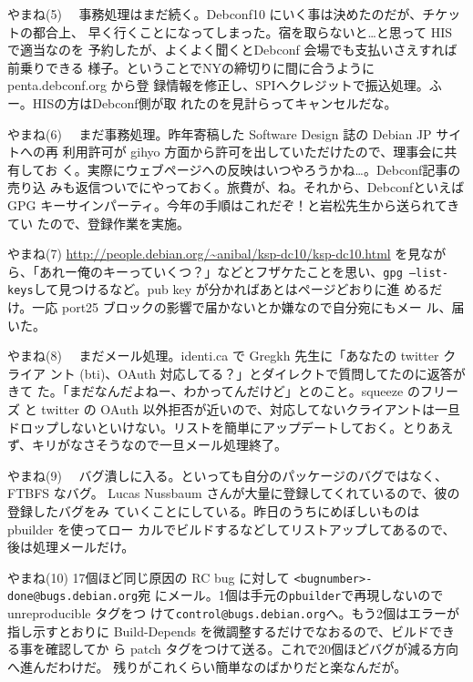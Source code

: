 \begin{frame}{やまね(5)}
　事務処理はまだ続く。Debconf10 にいく事は決めたのだが、チケットの都合上、
 早く行くことになってしまった。宿を取らないと…と思って HIS で適当なのを
 予約したが、よくよく聞くとDebconf 会場でも支払いさえすれば前乗りできる
 様子。ということでNYの締切りに間に合うように penta.debconf.org から登
 録情報を修正し、SPIへクレジットで振込処理。ふー。HISの方はDebconf側が取
 れたのを見計らってキャンセルだな。
\end{frame}

\begin{frame}{やまね(6)}
　まだ事務処理。昨年寄稿した Software Design 誌の Debian JP サイトへの再
 利用許可が gihyo 方面から許可を出していただけたので、理事会に共有してお
 く。実際にウェブページへの反映はいつやろうかね…。Debconf記事の売り込
 みも返信ついでにやっておく。旅費が、ね。それから、DebconfといえばGPG
 キーサインパーティ。今年の手順はこれだぞ！と岩松先生から送られてきてい
 たので、登録作業を実施。
\end{frame}

\begin{frame}{やまね(7)}
 \url{http://people.debian.org/~anibal/ksp-dc10/ksp-dc10.html} を見なが
 ら、「あれー俺のキーっていくつ？」などとフザケたことを思い、\texttt{gpg
 --list-keys}して見つけるなど。pub key が分かればあとはページどおりに進
 めるだけ。一応 port25 ブロックの影響で届かないとか嫌なので自分宛にもメー
 ル、届いた。
\end{frame}

\begin{frame}{やまね(8)}
　まだメール処理。identi.ca で Gregkh 先生に「あなたの twitter クライア
 ント (bti)、OAuth 対応してる？」とダイレクトで質問してたのに返答がきて
 た。「まだなんだよねー、わかってんだけど」とのこと。squeeze のフリーズ
 と twitter の OAuth 以外拒否が近いので、対応してないクライアントは一旦
 ドロップしないといけない。リストを簡単にアップデートしておく。とりあえ
 ず、キリがなさそうなので一旦メール処理終了。
\end{frame}

\begin{frame}{やまね(9)}
　バグ潰しに入る。といっても自分のパッケージのバグではなく、FTBFS なバグ。
 Lucas Nussbaum さんが大量に登録してくれているので、彼の登録したバグをみ
 ていくことにしている。昨日のうちにめぼしいものは pbuilder を使ってロー
 カルでビルドするなどしてリストアップしてあるので、後は処理メールだけ。
\end{frame}

\begin{frame}{やまね(10)}
 17個ほど同じ原因の RC bug に対して \texttt{<bugnumber>-done@bugs.debian.org}宛
 にメール。1個は手元の\texttt{pbuilder}で再現しないので unreproducible タグをつ
 けて\texttt{control@bugs.debian.org}へ。もう2個はエラーが指し示すとおりに
 Build-Depends を微調整するだけでなおるので、ビルドできる事を確認してか
 ら patch タグをつけて送る。これで20個ほどバグが減る方向へ進んだわけだ。
 残りがこれくらい簡単なのばかりだと楽なんだが。
\end{frame}

